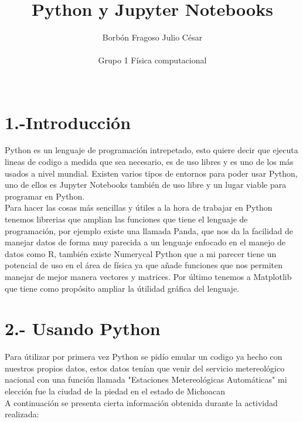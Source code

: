 \documentclass[notitlepage]{report}
\title{Python y Jupyter Notebooks}
\author{Borbón Fragoso Julio César\\ \\
\small{Grupo 1 Física computacional}\\
\small{}\\
\small}
\begin{document}
\maketitle

\section*{1.-Introducción}
Python es un lenguaje de programación intrepetado, esto quiere decir que ejecuta lineas de codigo a medida que sea necesario, es de uso libres y es uno de los más usados a nivel mundial. 
Existen varios tipos de entornos para poder usar Python, uno de ellos es Jupyter Notebooks también de uso libre y un lugar viable para programar en Python. \\ 
Para hacer las cosas más sencillas y útiles a la hora de trabajar en Python tenemos librerias que amplian las funciones que tiene el lenguaje de programación, por ejemplo existe una llamada Panda, que nos da la facilidad de manejar datos de forma muy parecida a un lenguaje enfocado en el manejo de datos como R, también existe Numerycal Python que a mi parecer tiene un potencial de uso en el área de física ya que añade funciones que nos permiten manejar de mejor manera vectores y matrices.  Por último tenemos a Matplotlib que tiene como propósito ampliar la útilidad gráfica del lenguaje.


\section*{2.- Usando Python}
Para útilizar por primera vez Python se pidío emular un codigo ya hecho con nuestros propios datos, estos datos tenían que venir del servicio metereológico  nacional con una función llamada "Estaciones Metereológicas Automáticas" mi elección fue la ciudad de la piedad en el estado de Michoacan  \\
A continuación se presenta cierta información obtenida durante la actividad realizada: \\ 
\end{document}
